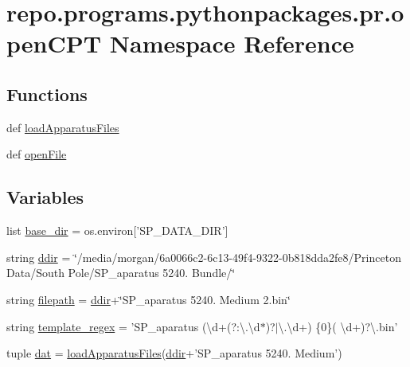\hypertarget{namespacerepo_1_1programs_1_1pythonpackages_1_1pr_1_1openCPT}{\section{repo.\-programs.\-pythonpackages.\-pr.\-open\-C\-P\-T Namespace Reference}
\label{namespacerepo_1_1programs_1_1pythonpackages_1_1pr_1_1openCPT}
}
\subsection*{Functions}
\begin{DoxyCompactItemize}
\item 
def \hyperlink{namespacerepo_1_1programs_1_1pythonpackages_1_1pr_1_1openCPT_a8d2cf2d1cdb625fa3ea7d0ec4e7af575}{load\-Apparatus\-Files}
\item 
def \hyperlink{namespacerepo_1_1programs_1_1pythonpackages_1_1pr_1_1openCPT_a123c419a688aefb0d6d482eca7512d36}{open\-File}
\end{DoxyCompactItemize}
\subsection*{Variables}
\begin{DoxyCompactItemize}
\item 
list \hyperlink{namespacerepo_1_1programs_1_1pythonpackages_1_1pr_1_1openCPT_a6195f6525b22b29221384f9235fe1062}{base\-\_\-dir} = os.\-environ\mbox{[}'S\-P\-\_\-\-D\-A\-T\-A\-\_\-\-D\-I\-R'\mbox{]}
\item 
string \hyperlink{namespacerepo_1_1programs_1_1pythonpackages_1_1pr_1_1openCPT_a629d9addea1bbee10544941d7c301ba8}{ddir} = \char`\"{}/media/morgan/6a0066c2-\/6c13-\/49f4-\/9322-\/0b818dda2fe8/\-Princeton Data/\-South Pole/\-S\-P\-\_\-aparatus 5240. Bundle/\char`\"{}
\item 
string \hyperlink{namespacerepo_1_1programs_1_1pythonpackages_1_1pr_1_1openCPT_ad49f00cb69a927479558926f2158898f}{filepath} = \hyperlink{namespacerepo_1_1programs_1_1pythonpackages_1_1pr_1_1openCPT_a629d9addea1bbee10544941d7c301ba8}{ddir}+\char`\"{}S\-P\-\_\-aparatus 5240. Medium 2.bin\char`\"{}
\item 
string \hyperlink{namespacerepo_1_1programs_1_1pythonpackages_1_1pr_1_1openCPT_a87910852db48cafc314ea9372f00a401}{template\-\_\-regex} = 'S\-P\-\_\-aparatus (\textbackslash{}d+(?\-:\textbackslash{}.\textbackslash{}d$\ast$)?$\vert$\textbackslash{}.\textbackslash{}d+) \{0\}( \textbackslash{}d+)?\textbackslash{}.bin'
\item 
tuple \hyperlink{namespacerepo_1_1programs_1_1pythonpackages_1_1pr_1_1openCPT_a3e5077d300b3260fd9aa1487e0e15a3e}{dat} = \hyperlink{namespacerepo_1_1programs_1_1pythonpackages_1_1pr_1_1openCPT_a8d2cf2d1cdb625fa3ea7d0ec4e7af575}{load\-Apparatus\-Files}(\hyperlink{namespacerepo_1_1programs_1_1pythonpackages_1_1pr_1_1openCPT_a629d9addea1bbee10544941d7c301ba8}{ddir}+'S\-P\-\_\-aparatus 5240. Medium')
\end{DoxyCompactItemize}


